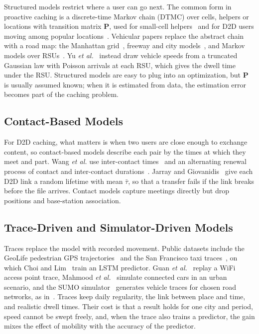 Structured models restrict where a user can go next. The common form in proactive caching is a discrete-time Markov chain (DTMC) over cells, helpers or locations with transition matrix $\mathbf{P}$, used for small-cell helpers~\cite{poularakis2013exploiting,poularakis2017code,ozfatura2020mobility} and for D2D users moving among popular locations~\cite{hosny2016allerton}. Vehicular papers replace the abstract chain with a road map: the Manhattan grid~\cite{alnagar2019city}, freeway and city models~\cite{alnagar2022mobility}, and Markov models over RSUs~\cite{wang2024markov}. Yu \emph{et al.}~\cite{yu2021mobility} instead draw vehicle speeds from a truncated Gaussian law with Poisson arrivals at each RSU, which gives the dwell time under the RSU. Structured models are easy to plug into an optimization, but $\mathbf{P}$ is usually assumed known; when it is estimated from data, the estimation error becomes part of the caching problem.

\subsection{Contact-Based Models}
\label{subsec:contact}

For D2D caching, what matters is when two users are close enough to exchange content, so contact-based models describe each pair by the times at which they meet and part. Wang \emph{et al.} use inter-contact times~\cite{wang2017mobility} and an alternating renewal process of contact and inter-contact durations~\cite{wang2018exploiting}. Jarray and Giovanidis~\cite{jarray2016mobility} give each D2D link a random lifetime with mean $\bar{\tau}$, so that a transfer fails if the link breaks before the file arrives. Contact models capture meetings directly but drop positions and base-station association.

\subsection{Trace-Driven and Simulator-Driven Models}
\label{subsec:traces}

Traces replace the model with recorded movement. Public datasets include the GeoLife pedestrian GPS trajectories~\cite{zheng2010geolife} and the San Francisco taxi traces~\cite{piorkowski2009parsimonious}, on which Choi and Lim~\cite{choi2023deep} train an LSTM predictor. Guan \emph{et al.}~\cite{guan2014mobicacher} replay a WiFi access point trace, Mahmood \emph{et al.}~\cite{mahmood2019rich} simulate connected cars in an urban scenario, and the SUMO simulator~\cite{lopez2018sumo} generates vehicle traces for chosen road networks, as in~\cite{wangq2022proactive}. Traces keep daily regularity, the link between place and time, and realistic dwell times. Their cost is that a result holds for one city and period, speed cannot be swept freely, and, when the trace also trains a predictor, the gain mixes the effect of mobility with the accuracy of the predictor.

